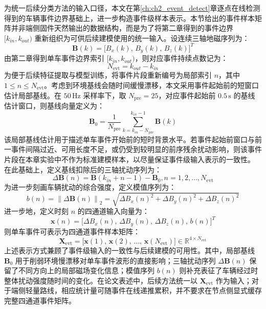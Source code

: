 \documentclass{xdupgthesis}
\begin{document}
为统一后续分类方法的输入口径，本文在第\ref{ch:ch2_event_detect}章逐点在线检测得到的车辆事件边界基础上，进一步构造事件级样本表示。本节给出的事件样本矩阵并非端侧固件天然输出的数据结构，而是为了将第二章得到的事件边界 $[k_{in},k_{out})$ 重新组织为可供后续建模使用的统一输入。设连续三轴地磁序列为：
\begin{equation}
    \mathbf{B}(k)=\big[B_x(k),\,B_y(k),\,B_z(k)\big]^T
\end{equation}
由第二章得到单车事件边界索引 $[k_{in},k_{out})$，则对应事件持续点数记为：
\begin{equation}
    N_{\mathrm{evt}}=k_{out}-k_{in}
\end{equation}
为便于后续特征提取与模型训练，将事件片段重新编号为局部索引 $n$，其中 $1\le n\le N_{\mathrm{evt}}$。考虑到环境基线会随时间缓慢漂移，本文采用事件起始前的短窗口估计局部基线。在 $50\,\mathrm{Hz}$ 采样率下，取 $N_{\mathrm{pre}}=25$，对应事件起始前 $0.5\,\mathrm{s}$ 的基线估计窗口，则基线向量定义为：
\begin{equation}
    \mathbf{B}_0=\frac{1}{N_{\mathrm{pre}}}\sum_{k=k_{in}-N_{\mathrm{pre}}}^{k_{in}-1}\mathbf{B}(k)
\end{equation}
该局部基线估计用于描述单车事件开始前的短时背景水平。若事件起始前窗口与前一事件间隔过近、可用长度不足，或仍受到较明显的前序残余扰动影响，则该事件片段在本章实验中不作为标准建模样本，以尽量保证事件级输入表示的一致性。
在此基础上，定义基线扣除后的三轴扰动序列为：
\begin{equation}
    \Delta\mathbf{B}(n)=\mathbf{B}(k_{in}+n-1)-\mathbf{B}_0, n=1,2,\ldots,N_{\mathrm{evt}}
\end{equation}
为进一步刻画车辆扰动的综合强度，定义模值序列为：
\begin{equation}
    b(n)=\left\|\Delta\mathbf{B}(n)\right\|_2
    =\sqrt{\Delta B_x(n)^2+\Delta B_y(n)^2+\Delta B_z(n)^2}
\end{equation}
进一步地，定义时刻 $n$ 的四通道输入向量为：
\begin{equation}
    \mathbf{x}(n)=\big[\Delta B_x(n),\,\Delta B_y(n),\,\Delta B_z(n),\,b(n)\big]^T
\end{equation}
则单车事件可表示为四通道事件样本矩阵：
\begin{equation}
    \mathbf{X}_{\mathrm{evt}}=
    \big[\mathbf{x}(1),\,\mathbf{x}(2),\,\ldots,\,\mathbf{x}(N_{\mathrm{evt}})\big]
    \in \mathbb{R}^{4\times N_{\mathrm{evt}}}
\end{equation}
上述表示方式兼顾了事件级输入的一致性与后续建模的可用性。其中，局部基线 $\mathbf{B}_0$ 用于削弱环境慢漂移对单车事件波形的直接影响；三轴扰动序列 $\Delta\mathbf{B}(n)$ 保留了不同方向上的局部磁场变化信息；模值序列 $b(n)$ 则补充表征了车辆经过时整体扰动强度随时间的变化。在论文表述中，后续方法统一以 $\mathbf{X}_{\mathrm{evt}}$ 作为输入；对于端侧轻量路线，相应统计量可随事件在线递推累积，并不要求在节点侧显式缓存完整四通道事件矩阵。
\end{document}
